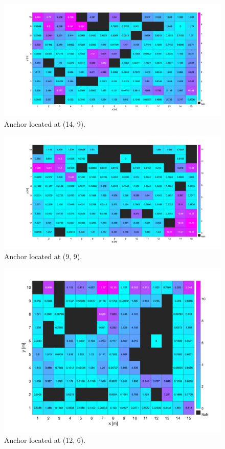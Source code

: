 \begin{figure}[H]
\centering
\includegraphics[width=.9\linewidth]{Images/hla_images/hla_anchor_(14_9)_clut.png}
\caption{Anchor located at (14, 9).}
\end{figure}

\begin{figure}[H]
\centering
\includegraphics[width=.9\linewidth]{Images/hla_images/hla_anchor_(9_9)_clut.png}
\caption{Anchor located at (9, 9).}
\end{figure}

\begin{figure}[H]
\centering
\includegraphics[width=.9\linewidth]{Images/hla_images/hla_anchor_(12_6)_clut.png}
\caption{Anchor located at (12, 6).}
\end{figure}

